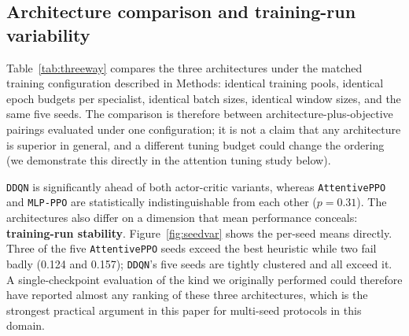 \documentclass[fleqn,10pt]{wlscirep}
\newcommand{\attentive}{\texttt{AttentivePPO}}
\newcommand{\mlpppo}{\texttt{MLP-PPO}}
\newcommand{\ddqn}{\texttt{DDQN}}
\begin{document}

\subsection*{Architecture comparison and training-run variability}
\label{sec:threeway}

Table~\ref{tab:threeway} compares the three architectures under the
matched training configuration described in Methods: identical training
pools, identical epoch budgets per specialist, identical batch sizes,
identical window sizes, and the same five seeds. The comparison is
therefore between architecture-plus-objective pairings evaluated under
one configuration; it is not a claim that any architecture is superior
in general, and a different tuning budget could change the ordering (we
demonstrate this directly in the attention tuning study below).

\ddqn{} is significantly ahead of both actor-critic variants, whereas
\attentive{} and \mlpppo{} are statistically indistinguishable from each
other ($p = 0.31$). The architectures also differ on a dimension that
mean performance conceals: \textbf{training-run stability}.
Figure~\ref{fig:seedvar} shows the per-seed means directly. Three of the
five \attentive{} seeds exceed the best heuristic while two fail badly
(0.124 and 0.157); \ddqn{}'s five seeds are tightly clustered and all
exceed it. A single-checkpoint evaluation of the kind we originally
performed could therefore have reported almost any ranking of these
three architectures, which is the strongest practical argument in this
paper for multi-seed protocols in this domain.
\end{document}
